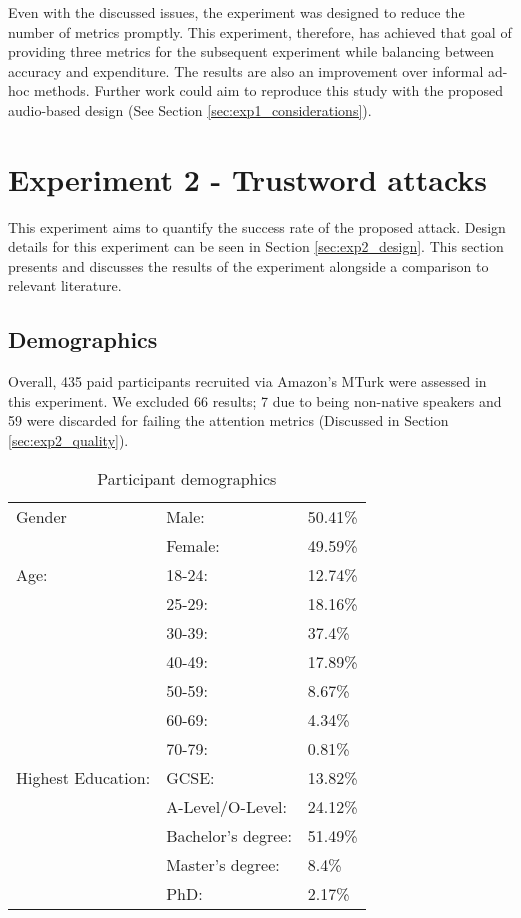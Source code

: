 Even with the discussed issues, the experiment was designed to reduce the number of metrics promptly. This experiment, therefore, has achieved that goal of providing three metrics for the subsequent experiment while balancing between accuracy and expenditure. The results are also an improvement over informal ad-hoc methods. Further work could aim to reproduce this study with the proposed audio-based design (See Section \ref{sec:exp1_considerations}).



\newpage

\section{Experiment 2 - Trustword attacks}
\label{sec:exp2}
This experiment aims to quantify the success rate of the proposed attack. Design details for this experiment can be seen in Section \ref{sec:exp2_design}. This section presents and discusses the results of the experiment alongside a comparison to relevant literature.

\subsection*{Demographics}
Overall, 435 paid participants recruited via Amazon's MTurk were assessed in this experiment. We excluded 66 results; 7 due to being non-native speakers and 59 were discarded for failing the attention metrics (Discussed in Section \ref{sec:exp2_quality}).

\begin{table}[h]
    \centering
    \begin{tabular}{|l|ll|}
        \hline
        Gender & Male: & 50.41\% \\
               & Female: & 49.59\% \\
        \hline
        Age:   & 18-24: & 12.74\% \\ 
               & 25-29: & 18.16\% \\ 
               & 30-39: & 37.4\% \\ 
               & 40-49: & 17.89\% \\ 
               & 50-59: & 8.67\% \\ 
               & 60-69: & 4.34\% \\ 
               & 70-79: & 0.81\% \\ 

        \hline
        Highest Education:  
        & GCSE:                 & 13.82\%  \\
        & A-Level/O-Level:      & 24.12\% \\
        & Bachelor's degree:    & 51.49\% \\
        & Master's degree:      & 8.4\% \\ 
        & PhD:                  & 2.17\% \\
        \hline

    \end{tabular}
    \caption{Participant demographics}
    \label{tab:exp2_demo}
\end{table}

